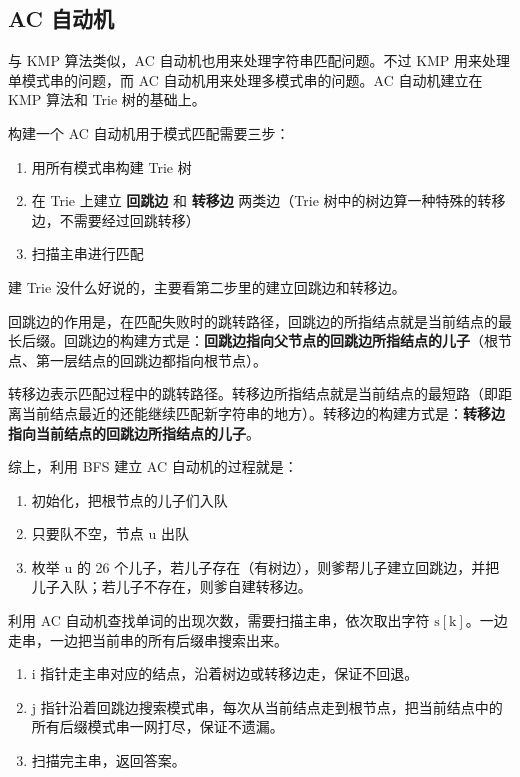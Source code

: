 \documentclass[UTF8]{article}
\begin{document}
\subsection{AC 自动机}
与 KMP 算法类似，AC 自动机也用来处理字符串匹配问题。不过 KMP 用来处理单模式串的问题，而 AC 自动机用来处理多模式串的问题。AC 自动机建立在 KMP 算法和 Trie 树的基础上。

构建一个 AC 自动机用于模式匹配需要三步：

\begin{enumerate}
	\item 用所有模式串构建 Trie 树
	\item 在 Trie 上建立 \textbf{回跳边} 和 \textbf{转移边} 两类边（Trie 树中的树边算一种特殊的转移边，不需要经过回跳转移）
	\item 扫描主串进行匹配
\end{enumerate}

建 Trie 没什么好说的，主要看第二步里的建立回跳边和转移边。

回跳边的作用是，在匹配失败时的跳转路径，回跳边的所指结点就是当前结点的最长后缀。回跳边的构建方式是：\textbf{回跳边指向父节点的回跳边所指结点的儿子}（根节点、第一层结点的回跳边都指向根节点）。

转移边表示匹配过程中的跳转路径。转移边所指结点就是当前结点的最短路（即距离当前结点最近的还能继续匹配新字符串的地方）。转移边的构建方式是：\textbf{转移边指向当前结点的回跳边所指结点的儿子}。

综上，利用 BFS 建立 AC 自动机的过程就是：

\begin{enumerate}
	\item 初始化，把根节点的儿子们入队
	\item 只要队不空，节点 u 出队
	\item 枚举 u 的 26 个儿子，若儿子存在（有树边），则爹帮儿子建立回跳边，并把儿子入队；若儿子不存在，则爹自建转移边。
\end{enumerate}

利用 AC 自动机查找单词的出现次数，需要扫描主串，依次取出字符 $\mathrm{s[k]}$。一边走串，一边把当前串的所有后缀串搜索出来。

\begin{enumerate}
	\item i 指针走主串对应的结点，沿着树边或转移边走，保证不回退。												
	\item j 指针沿着回跳边搜索模式串，每次从当前结点走到根节点，把当前结点中的所有后缀模式串一网打尽，保证不遗漏。
	\item 扫描完主串，返回答案。
\end{enumerate}
\end{document}
